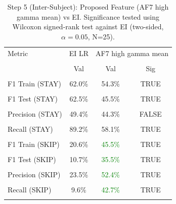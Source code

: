 \begin{table}[H]
\centering
\begin{tabular}{lccc}
\hline
Metric & EI LR & \multicolumn{2}{c}{AF7 high gamma mean} \\\\
 & Val & Val & Sig \\\\
\hline
F1 Train (STAY) & 62.0\% & 54.3\% & TRUE \\\\
F1 Test (STAY) & 62.5\% & 45.5\% & TRUE \\\\
Precision (STAY) & 49.4\% & 44.3\% & FALSE \\\\
Recall (STAY) & 89.2\% & 58.1\% & TRUE \\\\
F1 Train (SKIP) & 20.6\% & \textcolor{green}{45.5\%} & TRUE \\\\
F1 Test (SKIP) & 10.7\% & \textcolor{green}{35.5\%} & TRUE \\\\
Precision (SKIP) & 23.5\% & \textcolor{green}{52.4\%} & TRUE \\\\
Recall (SKIP) & 9.6\% & \textcolor{green}{42.7\%} & TRUE \\\\
\hline
\end{tabular}
\caption{Step 5 (Inter-Subject): Proposed Feature (AF7 high gamma mean) vs EI. Significance tested using Wilcoxon signed-rank test against EI (two-sided, $\alpha=0.05$, N=25).}
\label{tab:metrics_5_inter_1}
\end{table}